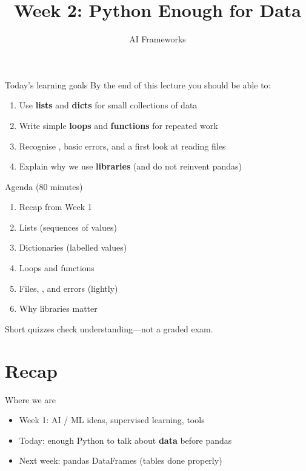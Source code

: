 \documentclass[aspectratio=169,11pt]{beamer}
\title{Week 2: Python Enough for Data}
\subtitle{AI Frameworks}
\begin{document}
    \begin{frame}
        \titlepage
    \end{frame}

    \begin{frame}{Today's learning goals}
        By the end of this lecture you should be able to:
        \begin{enumerate}
            \item Use \textbf{lists} and \textbf{dicts} for small collections of data
            \item Write simple \textbf{loops} and \textbf{functions} for repeated work
            \item Recognise , basic errors, and a first look at reading files
            \item Explain why we use \textbf{libraries} (and do not reinvent pandas)
        \end{enumerate}
    \end{frame}

    \begin{frame}{Agenda (80 minutes)}
        \begin{enumerate}
            \item Recap from Week 1
            \item Lists (sequences of values)
            \item Dictionaries (labelled values)
            \item Loops and functions
            \item Files, , and errors (lightly)
            \item Why libraries matter
        \end{enumerate}
        \vspace{0.5em}
        Short quizzes check understanding---not a graded exam.
    \end{frame}

    \section{Recap}

    \begin{frame}{Where we are}
        \begin{itemize}
            \item Week 1: AI / ML ideas, supervised learning, tools
            \item Today: enough Python to talk about \textbf{data} before pandas
            \item Next week: pandas DataFrames (tables done properly)
        \end{itemize}
        \vspace{0.5em}
    \end{frame}
\end{document}
